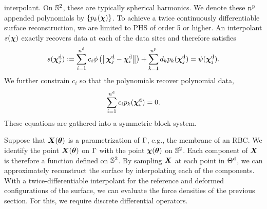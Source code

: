 interpolant. On $\mathbb{S}^2$, these are typically spherical harmonics. We denote these
${n}^\text{p}$ appended polynomials by $\{p_k(\boldsymbol{\chi})\}$. To achieve a twice
continuously differentiable surface reconstruction, we are limited to PHS of order 5 or
higher. An interpolant $s(\boldsymbol{\chi})$ exactly recovers data at each of the data sites and
therefore satisfies
\begin{equation}
    s({\boldsymbol{\chi}}^\text{d}_j)
    := \sum_{i=1}^{{n}^\text{d}} c_i \phi\left(\left\|{\boldsymbol{\chi}}^\text{d}_j-{\boldsymbol{\chi}}^\text{d}_i\right\|\right)
    + \sum_{k=1}^{{n}^\text{p}} d_k p_k({\boldsymbol{\chi}}^\text{d}_j)
    = \psi({\boldsymbol{\chi}}^\text{d}_j).
    \label{eq:interpolant}
\end{equation}
We further constrain $c_i$ so that the polynomials recover polynomial data,
\begin{equation}
    \sum_{i=1}^{{n}^\text{d}} c_i p_k({\boldsymbol{\chi}}^\text{d}_i) = 0.
    \label{eq:constraints}
\end{equation}
These equations are gathered into a symmetric block system.

Suppose that $\boldsymbol{X}(\boldsymbol{\theta})$ is a parametrization of $\Gamma$, e.g., the membrane of an
RBC. We identify the point $\boldsymbol{X}(\boldsymbol{\theta})$ on $\Gamma$ with the point $\boldsymbol{\chi}(\boldsymbol{\theta})$ on
$\mathbb{S}^2$. Each component of $\boldsymbol{X}$ is therefore a function defined on $\mathbb{S}^2$.
By sampling $\boldsymbol{X}$ at each point in ${\Theta}^\text{d}$, we can approximately reconstruct the
surface by interpolating each of the components. With a twice-differentiable interpolant
for the reference and deformed configurations of the surface, we can evaluate the force
densities of the previous section. For this, we require discrete differential operators.


